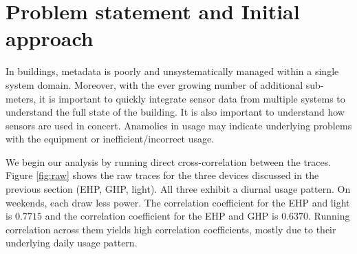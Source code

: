 


\section{Problem statement and Initial approach}\label{problem}

In buildings, metadata is poorly and unsystematically managed within a single system domain.  Moreover, 
with the ever growing number of additional sub-meters, it is important to quickly integrate
sensor data from multiple systems to understand the full state of the building.  It is also important to 
understand how sensors are used in concert.  Anamolies in usage may indicate underlying problems with 
the equipment or inefficient/incorrect usage.  

We begin our analysis by running direct cross-correlation between the traces.
Figure \ref{fig:raw} shows the raw traces for the three devices discussed in 
the previous section (EHP, GHP, light).  All three exhibit a diurnal usage pattern.  On weekends, each
draw less power.  The correlation coefficient for 
 the EHP and light is $0.7715$ and the correlation coefficient for the EHP and GHP is $0.6370$.
Running correlation across them yields high correlation coefficients, mostly
due to their underlying daily usage pattern.


